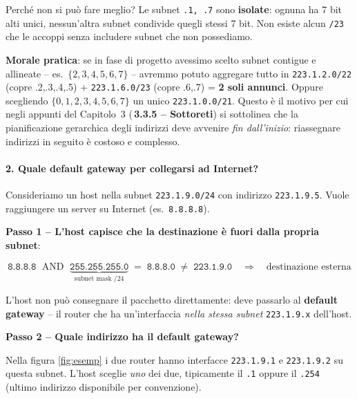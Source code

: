 \documentclass[a4paper,12pt]{report}
\begin{document}
\begin{urgentbox}{Perché non si può fare meglio?}
Le subnet \texttt{.1, .7} sono \textbf{isolate}: ognuna ha
7 bit alti unici, nessun'altra subnet condivide quegli stessi
7 bit. Non esiste alcun \texttt{/23} che le accoppi senza
includere subnet che non possediamo.

\textbf{Morale pratica}: se in fase di progetto avessimo
scelto subnet contigue e allineate -- es.\
$\{2,3,4,5,6,7\}$ -- avremmo potuto aggregare tutto in
\texttt{223.1.2.0/22} (copre .2,.3,.4,.5) +
\texttt{223.1.6.0/23} (copre .6,.7) = \textbf{2 soli
annunci}. Oppure scegliendo $\{0,1,2,3,4,5,6,7\}$
un unico \texttt{223.1.0.0/21}.
Questo è il motivo per cui negli appunti del Capitolo~3
(\textbf{\,3.3.5 -- Sottoreti}) si sottolinea che
la pianificazione gerarchica degli indirizzi deve
avvenire \emph{fin dall'inizio}: riassegnare
indirizzi in seguito è costoso e complesso.
\end{urgentbox}

\paragraph{2. Quale default gateway per collegarsi ad Internet?}

\vspace{0.5cm}
 Consideriamo un host nella subnet
\texttt{223.1.9.0/24} con indirizzo \texttt{223.1.9.5}.
Vuole raggiungere un server su Internet (es.\
\texttt{8.8.8.8}).

\textbf{Passo 1 -- L'host capisce che la destinazione è
fuori dalla propria subnet}:

\[
    \texttt{8.8.8.8} \;\text{ AND }\;
    \underbrace{\texttt{255.255.255.0}}_{\text{subnet mask /24}}
    \;=\; \texttt{8.8.8.0}
    \;\neq\; \texttt{223.1.9.0}
    \quad \Rightarrow \quad
    \text{destinazione esterna}
\]

L'host non può consegnare il pacchetto direttamente:
deve passarlo al \textbf{default gateway} --
il router che ha un'interfaccia \emph{nella stessa subnet}
\texttt{223.1.9.x} dell'host.

\vspace{0.5cm}
\textbf{Passo 2 -- Quale indirizzo ha il default gateway?}

Nella figura \ref{fig:esemp} i due router hanno
interfacce \texttt{223.1.9.1} e \texttt{223.1.9.2}
su questa subnet. L'host sceglie \emph{uno} dei due,
tipicamente il \texttt{.1} oppure il \texttt{.254}
(ultimo indirizzo disponibile per convenzione).
\end{document}
